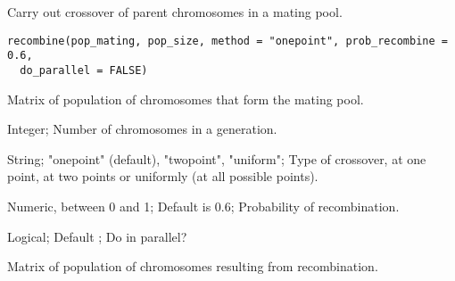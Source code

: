 %
\begin{Description}\relax
Carry out crossover of parent chromosomes in a mating pool.
\end{Description}
%
\begin{Usage}
\begin{verbatim}
recombine(pop_mating, pop_size, method = "onepoint", prob_recombine = 0.6,
  do_parallel = FALSE)
\end{verbatim}
\end{Usage}
%
\begin{Arguments}
\begin{ldescription}
\item[\code{pop\_mating}] Matrix of population of chromosomes that form the mating pool.

\item[\code{pop\_size}] Integer; Number of chromosomes in a generation.

\item[\code{method}] String; "onepoint" (default), "twopoint", "uniform";
Type of crossover, at one point, at two points or uniformly (at all possible points).

\item[\code{prob\_recombine}] Numeric, between 0 and 1; Default is 0.6;
Probability of recombination.

\item[\code{do\_parallel}] Logical; Default ; Do in parallel?
\end{ldescription}
\end{Arguments}
%
\begin{Value}
Matrix of population of chromosomes resulting from recombination.
\end{Value}
